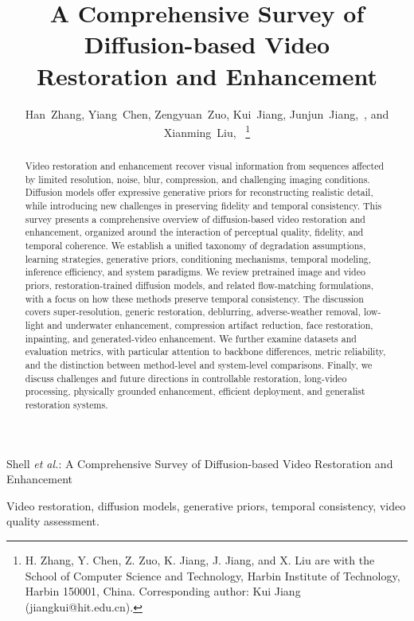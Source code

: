 \documentclass[journal]{IEEEtran}
\begin{document}
\title{A Comprehensive Survey of Diffusion-based Video\\Restoration and Enhancement}
\author{Han~Zhang, Yiang~Chen, Zengyuan~Zuo, Kui~Jiang, Junjun~Jiang,~, and Xianming~Liu,~
\thanks{H. Zhang, Y. Chen, Z. Zuo, K. Jiang, J. Jiang, and X. Liu are with the School of Computer Science and Technology, Harbin Institute of Technology, Harbin 150001, China. Corresponding author: Kui Jiang (jiangkui@hit.edu.cn).}}
%
{Shell \MakeLowercase{\textit{et al.}}: A Comprehensive Survey of Diffusion-based Video Restoration and Enhancement}
\maketitle
\begin{abstract}
Video restoration and enhancement recover visual information from sequences affected by limited resolution, noise, blur, compression, and challenging imaging conditions. Diffusion models offer expressive generative priors for reconstructing realistic detail, while introducing new challenges in preserving fidelity and temporal consistency. This survey presents a comprehensive overview of diffusion-based video restoration and enhancement, organized around the interaction of perceptual quality, fidelity, and temporal coherence. We establish a unified taxonomy of degradation assumptions, learning strategies, generative priors, conditioning mechanisms, temporal modeling, inference efficiency, and system paradigms. We review pretrained image and video priors, restoration-trained diffusion models, and related flow-matching formulations, with a focus on how these methods preserve temporal consistency. The discussion covers super-resolution, generic restoration, deblurring, adverse-weather removal, low-light and underwater enhancement, compression artifact reduction, face restoration, inpainting, and generated-video enhancement. We further examine datasets and evaluation metrics, with particular attention to backbone differences, metric reliability, and the distinction between method-level and system-level comparisons. Finally, we discuss challenges and future directions in controllable restoration, long-video processing, physically grounded enhancement, efficient deployment, and generalist restoration systems.
\end{abstract}
\begin{IEEEkeywords}
Video restoration, diffusion models, generative priors, temporal consistency, video quality assessment.
\end{IEEEkeywords}


\end{document}
